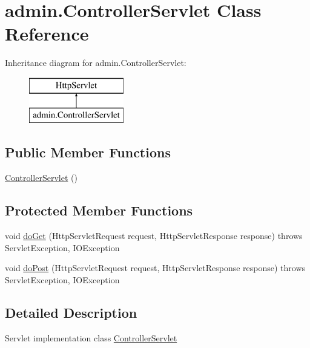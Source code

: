 \hypertarget{classadmin_1_1_controller_servlet}{}\section{admin.\+Controller\+Servlet Class Reference}
\label{classadmin_1_1_controller_servlet}
Inheritance diagram for admin.\+Controller\+Servlet\+:\begin{figure}[H]
\begin{center}
\leavevmode
\includegraphics[height=2.000000cm]{classadmin_1_1_controller_servlet}
\end{center}
\end{figure}
\subsection*{Public Member Functions}
\begin{DoxyCompactItemize}
\item 
\hyperlink{classadmin_1_1_controller_servlet_a72f312942007f269cbaf4d86fdd0df36}{Controller\+Servlet} ()
\end{DoxyCompactItemize}
\subsection*{Protected Member Functions}
\begin{DoxyCompactItemize}
\item 
void \hyperlink{classadmin_1_1_controller_servlet_a6b5c24ed500d5a4d110e5cb698187742}{do\+Get} (Http\+Servlet\+Request request, Http\+Servlet\+Response response)  throws Servlet\+Exception, I\+O\+Exception 
\item 
void \hyperlink{classadmin_1_1_controller_servlet_a2c99bb089d8be48e13466b5e5f8c2f95}{do\+Post} (Http\+Servlet\+Request request, Http\+Servlet\+Response response)  throws Servlet\+Exception, I\+O\+Exception 
\end{DoxyCompactItemize}


\subsection{Detailed Description}
Servlet implementation class \hyperlink{classadmin_1_1_controller_servlet}{Controller\+Servlet} 

